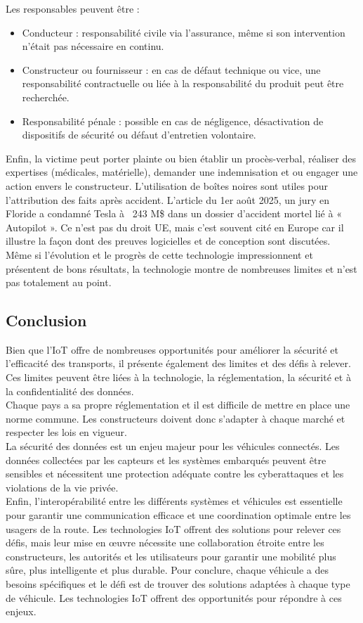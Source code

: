Les responsables peuvent être :
\begin{itemize}
    \item Conducteur : responsabilité civile via l’assurance, même si son intervention n’était pas nécessaire en continu.
    \item Constructeur ou fournisseur : en cas de défaut technique ou vice, une responsabilité contractuelle ou liée à la responsabilité du produit peut être recherchée.
    \item Responsabilité pénale : possible en cas de négligence, désactivation de dispositifs de sécurité ou défaut d’entretien volontaire.
\end{itemize}
Enfin, la victime peut porter plainte ou bien établir un procès-verbal, réaliser des expertises (médicales, matérielle), demander une indemnisation et ou engager une action envers le constructeur. L'utilisation de boîtes noires sont utiles pour l’attribution des faits après accident. L'article\cite{tesla_condamnation} du 1er août 2025, un jury en Floride a condamné Tesla à ~243 M\$ dans un dossier d’accident mortel lié à « Autopilot ». Ce n’est pas du droit UE, mais c’est souvent cité en Europe car il illustre la façon dont des preuves logicielles et de conception sont discutées.\\
Même si l'évolution et le progrès de cette technologie impressionnent et présentent de bons résultats, la technologie montre de nombreuses limites et n'est pas totalement au point.

\newpage
\subsection{Conclusion}
Bien que l’IoT offre de nombreuses opportunités pour améliorer la sécurité et l’efficacité des transports, il présente également des limites et des défis à relever. Ces limites peuvent être liées à la technologie, la réglementation, la sécurité et à la confidentialité des données.\\
Chaque pays a sa propre réglementation et il est difficile de mettre en place une norme commune. Les constructeurs doivent donc s'adapter à chaque marché et respecter les lois en vigueur.\\
La sécurité des données est un enjeu majeur pour les véhicules connectés. Les données collectées par les capteurs et les systèmes embarqués peuvent être sensibles et nécessitent une protection adéquate contre les cyberattaques et les violations de la vie privée.\\
Enfin, l'interopérabilité entre les différents systèmes et véhicules est essentielle pour garantir une communication efficace et une coordination optimale entre les usagers de la route. Les technologies IoT offrent des solutions pour relever ces défis, mais leur mise en œuvre nécessite une collaboration étroite entre les constructeurs, les autorités et les utilisateurs pour garantir une mobilité plus sûre, plus intelligente et plus durable.
Pour conclure, chaque véhicule a des besoins spécifiques et le défi est de trouver des solutions adaptées à chaque type de véhicule. Les technologies IoT offrent des opportunités pour répondre à ces enjeux.
\vspace{0.5cm}

